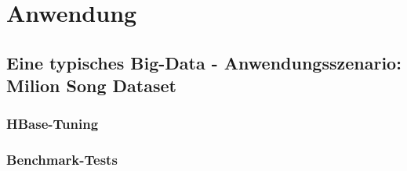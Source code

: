 \chapter{Anwendung}
\section{Eine typisches Big-Data -  Anwendungsszenario: Milion Song Dataset}


%


\subsection{HBase-Tuning}
\subsection{Benchmark-Tests}